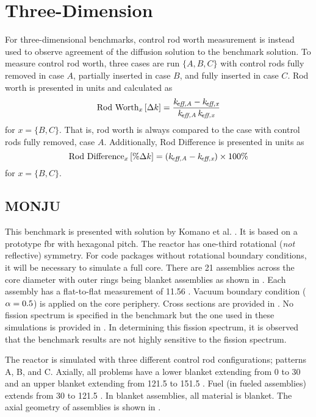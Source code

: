 \section{Three-Dimension}
  For three-dimensional benchmarks, control rod worth
  measurement is instead used to observe agreement of the diffusion solution 
  to the benchmark solution. To measure control rod worth, three cases are run
  $\{A,B,C\}$ with control rods fully removed in case $A$, partially inserted
  in case $B$, and fully inserted in case $C$. 
  Rod worth is presented in 
  units  and calculated as 
  \begin{equation}
    \text{Rod Worth}_x \left[\text{{$\Delta k$}}\right] = \frac{k_{\!\mbox{\scriptsize \em eff,{A}}} - k_{\!\mbox{\scriptsize \em eff,{x}}}}
      {k_{\!\mbox{\scriptsize \em eff,{A}}} \, k_{\!\mbox{\scriptsize \em eff,{x}}}}
  \end{equation}
  for $x = \{B,C\}$. That is, rod worth is always compared to the case with
  control rods fully removed, case $A$. Additionally, Rod Difference is
  presented in units  as
  \begin{equation}
    \text{Rod Difference}_x \left[\text{{$\% \Delta k$}}\right] = (k_{\!\mbox{\scriptsize \em eff,{A}}} - k_{\!\mbox{\scriptsize \em eff,{x}}}) 
      \times 100 \%
  \end{equation}
  for $x = \{B,C\}$.

  \subsection{MONJU}
    \label{sec:monju}
    This benchmark is presented with solution by Komano et al. 
    \cite{monjuBenchmark}. It is
    based on a prototype \gls{fbr} with hexagonal pitch. The reactor
    has one-third rotational (\textit{not} reflective) symmetry. For code
    packages without rotational boundary conditions, it will be necessary to
    simulate a full core. There are 21 assemblies across the core diameter with
    outer rings being blanket assemblies as shown in .
    Each assembly has a flat-to-flat measurement of 11.56 . Vacuum
    boundary condition ($\alpha = 0.5$) is applied on the core periphery. Cross
    sections are provided in . No fission spectrum is
    specified in the benchmark but the one used in these simulations is provided
    in . In determining this fission spectrum, it is observed
    that the benchmark results are not highly sensitive to the fission spectrum.

    The reactor is simulated with three different control rod configurations; 
    patterns A, B, and C. Axially, all problems have a lower blanket extending
    from 0  to 30  and an upper blanket extending from
    121.5  to 151.5 . Fuel (in fueled assemblies) extends
    from 30  to 121.5 . In blanket assemblies, all material
    is blanket. The axial geometry of assemblies is shown in
    .

